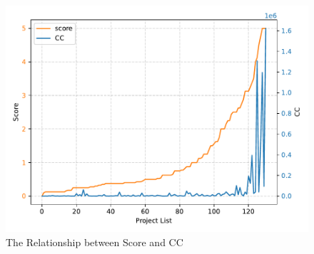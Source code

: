 \documentclass[sigconf,screen,review,anonymous]{acmart}
\begin{document}
\begin{figure}
  \centering
  \includegraphics[width=\linewidth]{figure2.pdf}
  \caption{The Relationship between Score and CC}
  \label{fig:figure2}
\end{figure}
\end{document}

